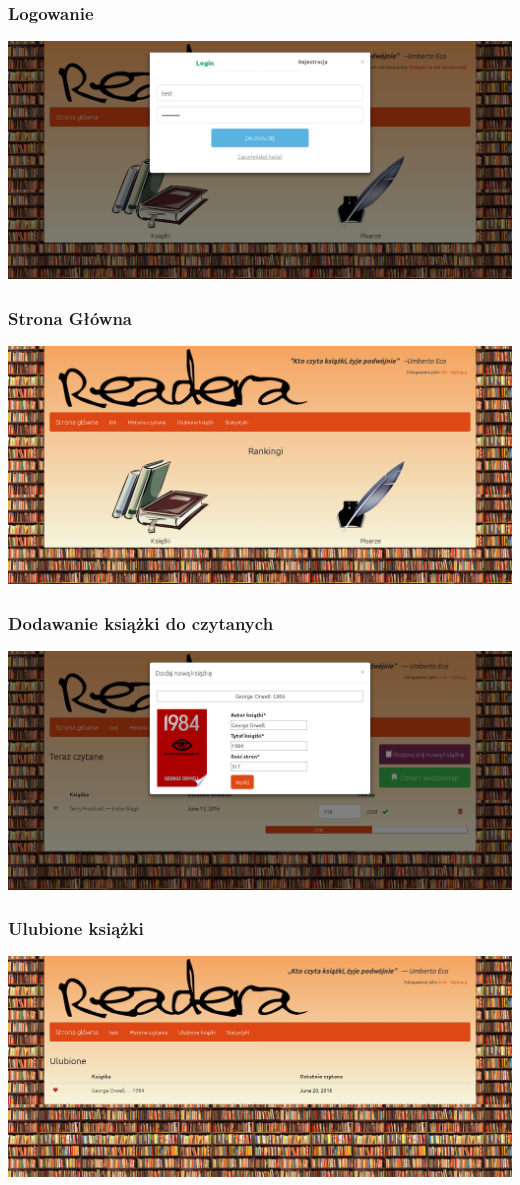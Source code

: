 \documentclass{beamer}
\begin{document}
    \begin{frame}
        \frametitle{Logowanie}
        \includegraphics[width=\textwidth]{login.png}
    \end{frame}
    \begin{frame}
        \frametitle{Strona Główna}
        \includegraphics[width=\textwidth]{main_page.png}
    \end{frame}
    \begin{frame}
        \frametitle{Dodawanie książki do czytanych}
        \includegraphics[width=\textwidth]{add_book.png}
    \end{frame}
    \begin{frame}
        \frametitle{Ulubione książki}
        \includegraphics[width=\textwidth]{favourite.png}
    \end{frame}
\end{document}
